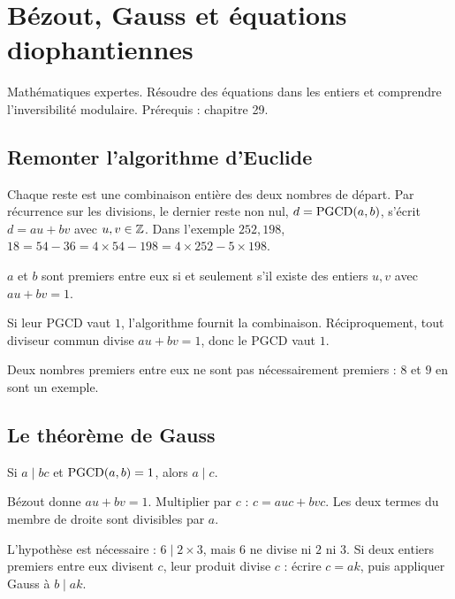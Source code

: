 \documentclass[../cours_tle.tex]{subfiles}
\begin{document}
\setcounter{chapter}{29}
\chapter{Bézout, Gauss et équations diophantiennes}
\label{ch:30}
\begin{objectif}
Mathématiques expertes. Résoudre des équations dans les entiers et comprendre l'inversibilité modulaire. Prérequis : chapitre 29.
\end{objectif}
\section{Remonter l'algorithme d'Euclide}
Chaque reste est une combinaison entière des deux nombres de départ. Par récurrence sur les divisions, le dernier reste non nul, $d=\operatorname{PGCD}(a,b)$, s'écrit $d=au+bv$ avec $u,v\in\mathbb{Z}$.
Dans l'exemple $252,198$,
$18=54-36=4\times54-198=4\times252-5\times198$.
\begin{theoreme}[Bézout]
$a$ et $b$ sont premiers entre eux si et seulement s'il existe des entiers $u,v$ avec $au+bv=1$.
\end{theoreme}
\begin{demonstration}
Si leur PGCD vaut $1$, l'algorithme fournit la combinaison.
Réciproquement, tout diviseur commun divise $au+bv=1$, donc le PGCD vaut $1$.
\end{demonstration}
Deux nombres premiers entre eux ne sont pas nécessairement premiers : $8$ et $9$ en sont un exemple.
\section{Le théorème de Gauss}
\begin{theoreme}
Si $a\mid bc$ et $\operatorname{PGCD}(a,b)=1$, alors $a\mid c$.
\end{theoreme}
\begin{demonstration}
Bézout donne $au+bv=1$. Multiplier par $c$ : $c=auc+bvc$. Les deux termes du membre de droite sont divisibles par $a$.
\end{demonstration}
L'hypothèse est nécessaire : $6\mid2\times3$, mais $6$ ne divise ni $2$ ni $3$.
Si deux entiers premiers entre eux divisent $c$, leur produit divise $c$ : écrire $c=ak$, puis appliquer Gauss à $b\mid ak$.
\end{document}

